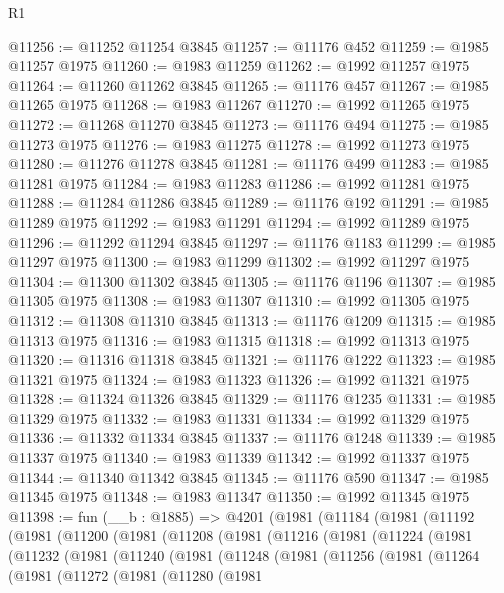 \begin{lexlean}{R1}
\begin{coremodule}
@11256 := @11252 @11254 @3845
@11257 := @11176 @452
@11259 := @1985 @11257 @1975
@11260 := @1983 @11259
@11262 := @1992 @11257 @1975
@11264 := @11260 @11262 @3845
@11265 := @11176 @457
@11267 := @1985 @11265 @1975
@11268 := @1983 @11267
@11270 := @1992 @11265 @1975
@11272 := @11268 @11270 @3845
@11273 := @11176 @494
@11275 := @1985 @11273 @1975
@11276 := @1983 @11275
@11278 := @1992 @11273 @1975
@11280 := @11276 @11278 @3845
@11281 := @11176 @499
@11283 := @1985 @11281 @1975
@11284 := @1983 @11283
@11286 := @1992 @11281 @1975
@11288 := @11284 @11286 @3845
@11289 := @11176 @192
@11291 := @1985 @11289 @1975
@11292 := @1983 @11291
@11294 := @1992 @11289 @1975
@11296 := @11292 @11294 @3845
@11297 := @11176 @1183
@11299 := @1985 @11297 @1975
@11300 := @1983 @11299
@11302 := @1992 @11297 @1975
@11304 := @11300 @11302 @3845
@11305 := @11176 @1196
@11307 := @1985 @11305 @1975
@11308 := @1983 @11307
@11310 := @1992 @11305 @1975
@11312 := @11308 @11310 @3845
@11313 := @11176 @1209
@11315 := @1985 @11313 @1975
@11316 := @1983 @11315
@11318 := @1992 @11313 @1975
@11320 := @11316 @11318 @3845
@11321 := @11176 @1222
@11323 := @1985 @11321 @1975
@11324 := @1983 @11323
@11326 := @1992 @11321 @1975
@11328 := @11324 @11326 @3845
@11329 := @11176 @1235
@11331 := @1985 @11329 @1975
@11332 := @1983 @11331
@11334 := @1992 @11329 @1975
@11336 := @11332 @11334 @3845
@11337 := @11176 @1248
@11339 := @1985 @11337 @1975
@11340 := @1983 @11339
@11342 := @1992 @11337 @1975
@11344 := @11340 @11342 @3845
@11345 := @11176 @590
@11347 := @1985 @11345 @1975
@11348 := @1983 @11347
@11350 := @1992 @11345 @1975
@11398 := fun (__b : @1885) =>
  @4201
    (@1981
      (@11184
        (@1981
          (@11192
            (@1981
              (@11200
                (@1981
                  (@11208
                    (@1981
                      (@11216
                        (@1981
                          (@11224
                            (@1981
                              (@11232
                                (@1981
                                  (@11240
                                    (@1981
                                      (@11248
                                        (@1981
                                          (@11256
                                            (@1981
                                              (@11264
                                                (@1981
                                                  (@11272
                                                    (@1981
                                                      (@11280
                                                        (@1981

\end{coremodule}
\end{lexlean}
